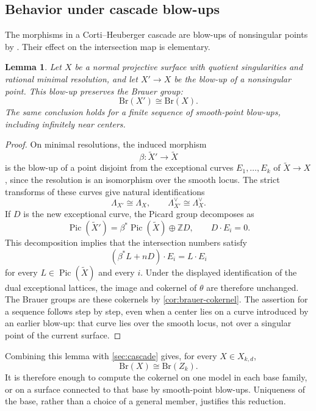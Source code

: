 \documentclass[11pt]{article}
\theoremstyle{plain}
\newtheorem{lemma}[lemma]{Lemma}
\theoremstyle{definition}
\theoremstyle{remark}
\newcommand{\Z}{\mathbb Z}
\newcommand{\Pic}{\operatorname{Pic}}
\newcommand{\Br}{\mathrm{Br}}
\begin{document}
\subsection{Behavior under cascade blow-ups}
\label{app:brauer-invariance}

The morphisms in a Corti--Heuberger cascade are blow-ups of nonsingular
points by \cite[Corollary~8]{Corti2016}. Their effect on the intersection map
is elementary.

\begin{lemma}\label{lem:brauer-cascade-invariance}
Let \(X\) be a normal projective surface with quotient singularities and
rational minimal resolution, and let \(X'\to X\) be the blow-up of a
nonsingular point. This blow-up preserves the Brauer group:
\[
\Br(X')\cong\Br(X).
\]
The same conclusion holds for a finite sequence of smooth-point blow-ups,
including infinitely near centers.
\end{lemma}

\begin{proof}
On minimal resolutions, the induced morphism
\[
\beta:\widetilde X'\longrightarrow\widetilde X
\]
is the blow-up of a point disjoint from the exceptional curves
\(E_1,\dots,E_k\) of \(\widetilde X\to X\), since the resolution is an
isomorphism over the smooth locus. The strict
transforms of these curves give natural identifications
\[
\Lambda_{X'}\cong\Lambda_X,
\qquad
\Lambda_{X'}^\vee\cong\Lambda_X^\vee.
\]
If \(D\) is the new exceptional curve, the Picard group decomposes as
\[
\Pic(\widetilde X')
=
\beta^*\Pic(\widetilde X)\oplus\Z D,
\qquad
D\cdot E_i=0.
\]
This decomposition implies that the intersection numbers satisfy
\[
(\beta^*L+nD)\cdot E_i=L\cdot E_i
\]
for every \(L\in\Pic(\widetilde X)\) and every \(i\). Under the displayed identification of the dual exceptional
lattices, the image and cokernel of \(\theta\) are therefore unchanged.
The Brauer groups are these cokernels by \cref{cor:brauer-cokernel}.
The assertion for a sequence follows step by step, even when a center
lies on a curve introduced by an earlier blow-up: that curve lies over
the smooth locus, not over a singular point of the current surface.
\end{proof}

Combining this lemma with \cref{sec:cascade} gives, for every
\(X\in X_{k,d}\),
\begin{equation}\label{eq:brauer-cascade}
\Br(X)\cong\Br(Z_k).
\end{equation}
It is therefore enough to compute the cokernel on one model in each
base family, or on a surface connected to that base by smooth-point
blow-ups. Uniqueness of the base, rather than a choice of a general
member, justifies this reduction.
\end{document}
